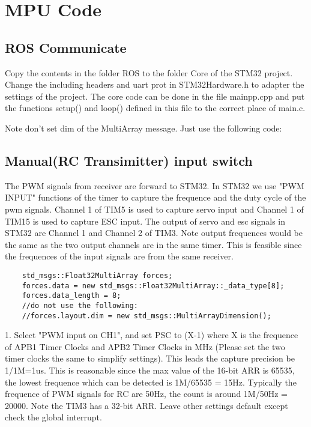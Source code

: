 \documentclass{article}
\begin{document}
\section{MPU Code}
\subsection{ROS Communicate}
Copy the contents in the folder ROS to the folder Core of the STM32 project. Change the including headers and uart prot in STM32Hardware.h to adapter the settings of the project. The core code can be done in the file mainpp.cpp and put the functions setup() and loop() defined in this file to the correct place of main.c.

Note don't set dim of the MultiArray message. Just use the following code:


\subsection{Manual(RC Transimitter) input switch}


The PWM signals from receiver are forward to STM32. In STM32 we use "PWM INPUT" functions of the timer to capture the frequence and the duty cycle of the pwm signals. Channel 1 of TIM5 is used to capture servo input and Channel 1 of TIM15 is used to capture ESC input. The output of servo and esc signals in STM32 are Channel 1 and Channel 2 of TIM3. Note output frequences would be the same as the two output channels are in the same timer. This is feasible since the frequences of the input signals are from the same receiver.
\begin{lstlisting}
	std_msgs::Float32MultiArray forces;
	forces.data = new std_msgs::Float32MultiArray::_data_type[8];
	forces.data_length = 8;
	//do not use the following:
	//forces.layout.dim = new std_msgs::MultiArrayDimension();

\end{lstlisting}
1. Select "PWM input on CH1", and set PSC to (X-1) where X is the frequence of APB1 Timer Clocks and APB2 Timer Clocks in MHz (Please set the two timer clocks the same to simplify settings). This leads the capture precision be 1/1M=1us. This is reasonable since the max value of the 16-bit ARR is 65535, the lowest frequence which can be detected is 1M/65535 = 15Hz. Typically the frequence of PWM signals for RC are 50Hz, the count is around 1M/50Hz = 20000. Note the TIM3 has a 32-bit ARR. 
Leave other settings default except check the global interrupt.
\end{document}
